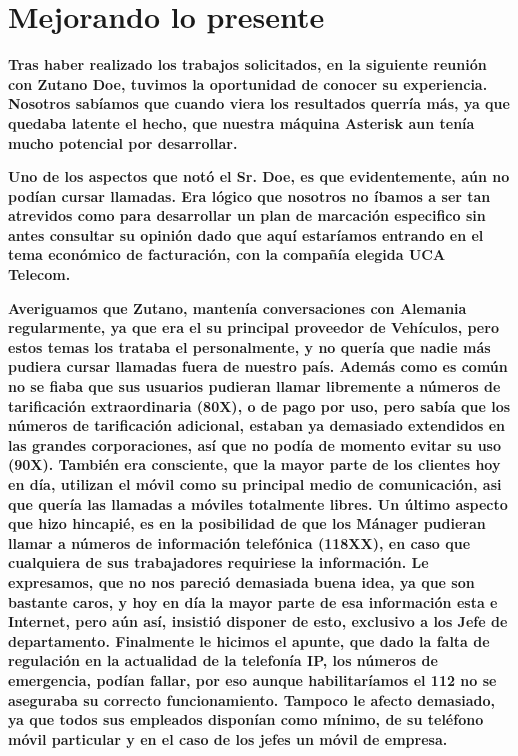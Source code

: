 
\section{Mejorando lo presente}

\textbf{Tras haber realizado los trabajos solicitados, en la siguiente reunión con Zutano Doe, tuvimos la oportunidad de conocer su experiencia. Nosotros sabíamos que cuando viera los resultados querría más, ya que quedaba latente el hecho, que nuestra máquina Asterisk aun tenía mucho potencial por desarrollar.}

\textbf{Uno de los aspectos que notó el Sr. Doe, es que evidentemente, aún no podían cursar llamadas. Era lógico que nosotros no íbamos a ser tan atrevidos como para desarrollar un plan de marcación especifico sin antes consultar su opinión dado que aquí estaríamos entrando en el tema económico de facturación, con la compañía elegida UCA Telecom.}

\textbf{Averiguamos que Zutano, mantenía conversaciones con Alemania regularmente, ya que era el su principal proveedor de Vehículos, pero estos temas los trataba el personalmente, y no quería que nadie más pudiera cursar llamadas fuera de nuestro país. Además como es común no se fiaba que sus usuarios pudieran llamar libremente a números de tarificación extraordinaria (80X), o de pago por uso, pero sabía que los números de tarificación adicional, estaban ya demasiado extendidos en las grandes corporaciones, así que no podía de momento evitar su uso (90X). También era consciente, que la mayor parte de los clientes hoy en día, utilizan el móvil como su principal medio de comunicación, asi que quería las llamadas a móviles totalmente libres. Un último aspecto que hizo hincapié, es en la posibilidad de que los Mánager pudieran llamar a números de información telefónica (118XX), en caso que cualquiera de sus trabajadores requiriese la información. Le expresamos, que no nos pareció demasiada buena idea, ya que son bastante caros, y hoy en día la mayor parte de esa información esta e Internet, pero aún así, insistió disponer de esto, exclusivo a los Jefe de departamento. Finalmente le hicimos el apunte, que dado la falta de regulación en la actualidad de la telefonía IP, los números de emergencia, podían fallar, por eso aunque habilitaríamos el 112 no se aseguraba su correcto funcionamiento. Tampoco le afecto demasiado, ya que todos sus empleados disponían como mínimo, de su teléfono móvil particular y en el caso de los jefes un móvil de empresa.}

